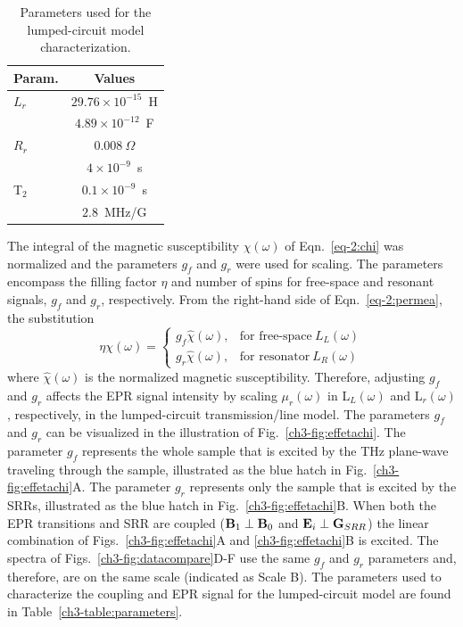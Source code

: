 \begin{table}[hbtp]
\centering
\caption{Parameters used for the lumped-circuit model characterization.}
\begin{tabular}{l|c}
\multicolumn{1}{l|}{Param.} & \multicolumn{1}{c}{Values} \\ \hline \hline
\multicolumn{1}{l|}{$L_r$} & \multicolumn{1}{c}{$29.76\times 10^{-15}$~H} \\
\rowcolor[rgb]{0.937,0.937,0.937}  
\multicolumn{1}{l|}{$C_r$} & \multicolumn{1}{c}{$4.89\times 10^{-12} $~F} \\
\multicolumn{1}{l|}{$R_r$} & \multicolumn{1}{c}{$0.008~\Omega$} \\
\rowcolor[rgb]{0.937,0.937,0.937}  
\multicolumn{1}{l|}{T$_1$} & \multicolumn{1}{c}{$4\times 10^{-9}$~s} \\
\multicolumn{1}{l|}{T$_2$} & \multicolumn{1}{c}{$0.1\times 10^{-9}$~s} \\
\rowcolor[rgb]{0.937,0.937,0.937}  
\multicolumn{1}{l|}{$\gamma$} & \multicolumn{1}{c}{$2.8$~MHz/G}
\end{tabular}\label{ch3-table:lumpedparameters}
\end{table}

The integral of the magnetic susceptibility $\chi(\omega)$ of Eqn.~\ref{eq-2:chi} was normalized and the parameters $g_f$ and $g_r$ were used for scaling. The parameters encompass the filling factor $\eta$ and number of spins for free-space and resonant signals, $g_f$ and $g_r$, respectively. From the right-hand side of Eqn.~\ref{eq-2:permea}, the substitution
\begin{equation}
    \eta \chi(\omega) =
    \begin{cases}
      g_f \hat{\chi}(\omega), & \text{for free-space}\ L_L(\omega) \\
      g_r \hat{\chi}(\omega), & \text{for resonator}\ L_R(\omega)
    \end{cases}
\end{equation}\label{etagfgr}
where $\hat{\chi}(\omega)$ is the normalized magnetic susceptibility. Therefore, adjusting  $g_f$ and $g_r$ affects the EPR signal intensity by scaling $\mu_r(\omega)$ in L$_L(\omega)$ and L$_r(\omega)$, respectively, in the lumped-circuit transmission\-/line model. The parameters $g_f$ and $g_r$ can be visualized in the illustration of Fig.~\ref{ch3-fig:effetachi}. The parameter $g_f$ represents the whole sample that is excited by the THz plane-wave traveling through the sample, illustrated as the blue hatch in Fig.~\ref{ch3-fig:effetachi}A. The parameter $g_r$ represents only the sample that is excited by the SRRs, illustrated as the blue hatch in Fig.~\ref{ch3-fig:effetachi}B. When both the EPR transitions and SRR are coupled ($\textbf{B}_{1}\perp\textbf{B}_{0}$ and $\textbf{E}_{i}\perp\textbf{G}_{SRR}$) the linear combination of Figs.~\ref{ch3-fig:effetachi}A and \ref{ch3-fig:effetachi}B is excited. The spectra of Figs.~\ref{ch3-fig:datacompare}D-F use the same $g_f$ and $g_r$ parameters and, therefore, are on the same scale (indicated as Scale B). The parameters used to characterize the coupling and EPR signal for the lumped-circuit model are found in Table~\ref{ch3-table:parameters}.

